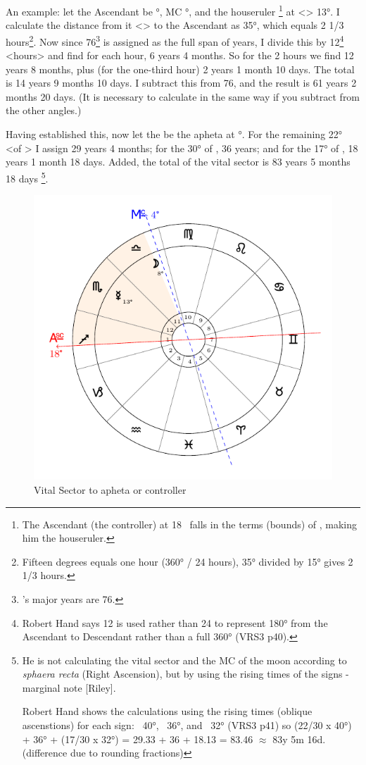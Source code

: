 An example: let the Ascendant be \Sagittarius\xspace 18°, MC \Libra\xspace 4°, and the houseruler \Mercury\xspace\footnote{The Ascendant (the controller) at 18 \Sagittarius\, falls in the terms (bounds) of \Mercury, making him the houseruler.} at
<\Scorpio> 13°. I calculate the distance from it <\Mercury> to the Ascendant as 35°, which equals 2 1/3 hours\footnote{Fifteen degrees equals one hour (360° / 24 hours), 35° divided by 15° gives 2 1/3 hours.}. Now since 76\footnote{\Mercury's major years are 76.} is assigned as the full span of years, I divide this by 12\footnote{Robert Hand says 12 is used rather than 24 to represent 180° from the Ascendant to Descendant rather than a full 360° (VRS3 p40).} <hours> and find for each hour, 6 years 4 months. So for the 2 hours we find 12 years 8 months, plus (for the one-third hour) 2 years 1 month 10 days. The total is 14 years 9 months 10 days. I subtract this from 76, and the result is 61 years 2 months 20 days. (It is necessary to calculate in the same way if you subtract from the other angles.)

Having established this, now let the \Moon\xspace be the apheta at \Libra\xspace 8°. For the remaining 22° <of \Libra> I assign 29 years 4 months; for the 30° of \Scorpio, 36 years; and for the 17° of \Sagittarius, 18 years 1 month 18 days. Added, the total of the vital sector is 83 years 5 months 18 days
\footnote{He is not calculating the vital sector and the MC of the moon according to \textsl{sphaera recta} (Right Ascension), but by using the rising times of the signs - marginal note [Riley].

Robert Hand shows the calculations using the rising times (oblique ascenstions) for each sign: \Libra\, 40°, \Scorpio\, 36°, and \Sagittarius\, 32° (VRS3 p41) so (22/30 x 40°) + 36° + (17/30 x 32°) = 29.33 + 36 + 18.13 = 83.46 $\approx$ 83y 5m 16d. (difference due to rounding fractions)}.

\begin{figure}[H]
\centering
\includegraphics[width=.7\textwidth]{charts/3_03_2a}
\caption{Vital Sector to apheta or controller}
\end{figure}

